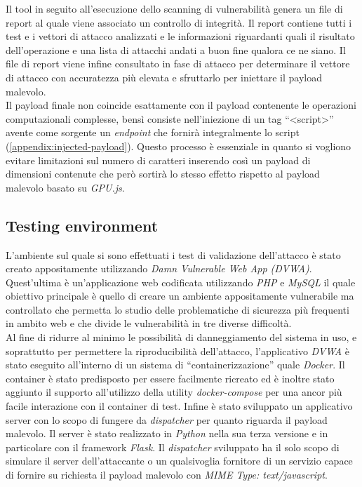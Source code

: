 \documentclass[conference, italian]{IEEEtran}
\begin{document}
Il tool in seguito all'esecuzione dello scanning di vulnerabilità genera un file di report al quale viene associato un controllo di integrità. Il report contiene tutti i test e i vettori di attacco analizzati e le informazioni riguardanti quali il risultato dell'operazione e una lista di attacchi andati a buon fine qualora ce ne siano. Il file di report viene infine consultato in fase di attacco per determinare il vettore di attacco con accuratezza più elevata e sfruttarlo per iniettare il payload malevolo.\\
Il payload finale non coincide esattamente con il payload contenente le operazioni computazionali complesse, bensì consiste nell'iniezione di un tag ``<script>'' avente come sorgente un \emph{endpoint} che fornirà integralmente lo script (\cref{appendix:injected-payload}). Questo processo è essenziale in quanto si vogliono evitare limitazioni sul numero di caratteri inserendo così un payload di dimensioni contenute che però sortirà lo stesso effetto rispetto al payload malevolo basato su \emph{GPU.js}.

\subsection{Testing environment}\label{sec:testing-environment}
L'ambiente sul quale si sono effettuati i test di validazione dell'attacco è stato creato appositamente utilizzando \emph{Damn Vulnerable Web App (DVWA)}\cite{DVWA}. Quest'ultima è un'applicazione web codificata utilizzando \emph{PHP} e \emph{MySQL} il quale obiettivo principale è quello di creare un ambiente appositamente vulnerabile ma controllato che permetta lo studio delle problematiche di sicurezza più frequenti in ambito web e che divide le vulnerabilità in tre diverse difficoltà.\\
Al fine di ridurre al minimo le possibilità di danneggiamento del sistema in uso, e soprattutto per permettere la riproducibilità dell'attacco, l'applicativo \emph{DVWA} è stato eseguito all'interno di un sistema di ``containerizzazione'' quale \emph{Docker}\cite{merkel2014docker}. Il container è stato predisposto per essere facilmente ricreato ed è inoltre stato aggiunto il supporto all'utilizzo della utility \emph{docker-compose} per una ancor più facile interazione con il container di test.
Infine è stato sviluppato un applicativo server con lo scopo di fungere da \emph{dispatcher} per quanto riguarda il payload malevolo. Il server è stato realizzato in \emph{Python} nella sua terza versione\cite{python3} e in particolare con il framework \emph{Flask}\cite{grinberg2018flask}. Il \emph{dispatcher} sviluppato ha il solo scopo di simulare il server dell'attaccante o un qualsivoglia fornitore di un servizio capace di fornire su richiesta il payload malevolo con \emph{MIME Type: text/javascript}\cite{MIMEType}.
\end{document}
